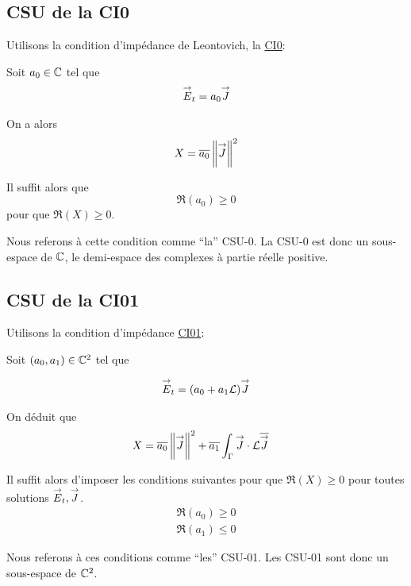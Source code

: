   \subsection{CSU de la CI0}
    Utilisons la condition d’impédance de Leontovich, la \hyperlink{ci0}{CI0}:

    Soit \(a_0 \in \mathbb C\) tel que
    \begin{align*}
      {\overset{\rightarrow}{E}}_t = a_0 {\overset{\rightarrow}{J}}
    \end{align*}

    On a alors
    \begin{equation*}
      X = {\overline{a_0}}\left\lVert{\overset{\rightarrow}{J}}\right\rVert^2
    \end{equation*}

    Il suffit alors que
    \begin{equation}
      \Re\left(a_0\right) \ge 0
    \end{equation}
    pour que \(\Re(X)\ge0\).

    Nous referons à cette condition comme ``la'' CSU-0. La CSU-0 est donc un sous-espace de \(\mathbb C\), le demi-espace des complexes à partie réelle positive.

  \subsection{CSU de la CI01}
    Utilisons la condition d’impédance \hyperlink{ci01}{CI01}:

    Soit \((a_0, a_1) \in \mathbb C^2\) tel que

    \begin{align*}
      {\overset{\rightarrow}{E}}_t = (a_0 +a_1 \mathcal{L}){\overset{\rightarrow}{J}}
    \end{align*}

    On déduit que
    \begin{align*}
      X & = {\overline{a_0}} \left\lVert{\overset{\rightarrow}{J}}\right\rVert ^2 + {\overline{a_1}}\int_\Gamma {\overset{\rightarrow}{J}}\cdot \mathcal{L}{\overline{{\overset{\rightarrow}{J}}}}
    \end{align*}

    Il suffit alors d'imposer les conditions suivantes pour que \(\Re(X)\ge 0\) pour toutes solutions \({\overset{\rightarrow}{E}}_t,{\overset{\rightarrow}{J}}\).
    \begin{align}
      \Re\left(a_0\right) \ge 0\\
      \Re\left(a_1\right) \le 0
    \end{align}

    Nous referons à ces conditions comme ``les'' CSU-01. Les CSU-01 sont donc un sous-espace de \(\mathbb C^2\).


